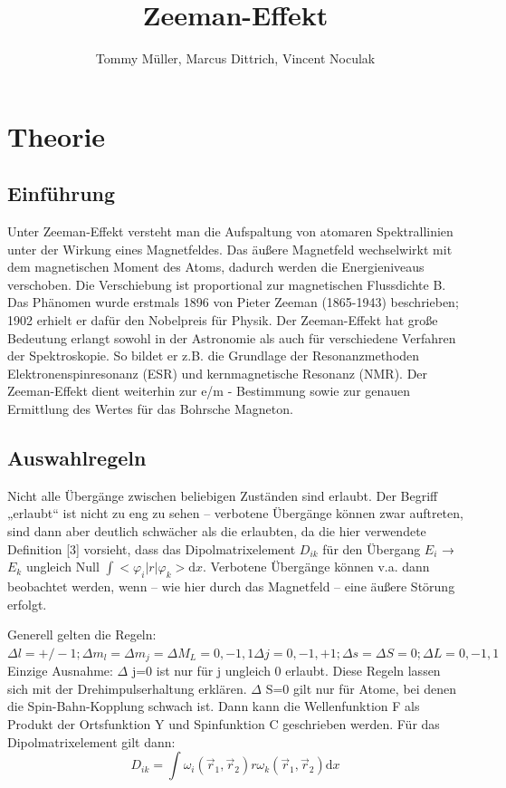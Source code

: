 \documentclass[10pt,a4paper]{article}
\author{Tommy Müller, Marcus Dittrich, Vincent Noculak}
\title{Zeeman-Effekt}
\begin{document}
\maketitle
\newpage
\tableofcontents
\newpage

\section{Theorie}


\subsection{ Einführung}


Unter Zeeman-Effekt versteht man die Aufspaltung von atomaren Spektrallinien unter der Wirkung eines Magnetfeldes. Das äußere Magnetfeld wechselwirkt mit dem magnetischen Moment des Atoms, dadurch werden die Energieniveaus verschoben. Die Verschiebung ist proportional zur magnetischen Flussdichte B. Das Phänomen wurde erstmals 1896 von Pieter Zeeman (1865-1943) beschrieben; 1902 erhielt er dafür den Nobelpreis für Physik. Der Zeeman-Effekt hat große Bedeutung erlangt sowohl in der Astronomie als auch für verschiedene Verfahren der Spektroskopie. So bildet er z.B. die Grundlage der Resonanzmethoden Elektronenspinresonanz (ESR) und kernmagnetische Resonanz (NMR). Der Zeeman-Effekt dient weiterhin zur e/m - Bestimmung sowie zur genauen Ermittlung des Wertes für das Bohrsche Magneton.


\subsection{ Auswahlregeln}


Nicht alle Übergänge zwischen beliebigen Zuständen sind erlaubt. Der Begriff „erlaubt“ ist nicht zu eng zu sehen – verbotene Übergänge können zwar auftreten, sind dann aber deutlich schwächer als die erlaubten, da die hier verwendete Definition [3] vorsieht, dass das Dipolmatrixelement $D_{ik}$  für den Übergang $E_{i}$ → $E_{k}$ ungleich Null $\int <\varphi_{i} |r| \varphi_{k}>\mathrm{d}x$. Verbotene Übergänge können v.a. dann beobachtet werden, wenn – wie hier durch das Magnetfeld – eine äußere Störung erfolgt.   


Generell gelten die Regeln: $ \Delta l=+/-1 ;\Delta m_{l}=\Delta m_{j}= \Delta M_L=0 ,-1,1 \Delta j=0,-1,+1;\Delta s=\Delta S=0;\Delta L=0,-1,1$ Einzige Ausnahme: $\Delta$ j=0 ist nur für j ungleich 0 erlaubt. Diese Regeln lassen sich mit der Drehimpulserhaltung erklären. $\Delta$ S=0 gilt nur für Atome, bei denen die Spin-Bahn-Kopplung schwach ist. Dann kann die Wellenfunktion F  als Produkt der Ortsfunktion Y und Spinfunktion C geschrieben werden. Für das Dipolmatrixelement gilt dann: 
\begin{equation}
D_{ik}= \int\omega_{i}(\overrightarrow{r}_{1},\overrightarrow{r}_{2})r\omega_{k}(\overrightarrow{r}_{1},\overrightarrow{r}_{2})\mathrm{d}x
\end{equation}
\end{document}

